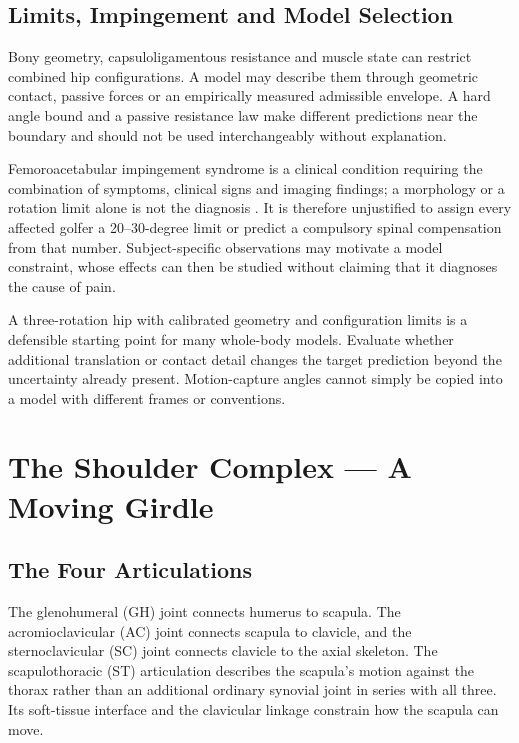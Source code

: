 \subsection{Limits, Impingement and Model Selection}\label{limits-impingement-and-model-selection}

Bony geometry, capsuloligamentous resistance and muscle state can restrict combined hip configurations. A model may describe them through geometric contact, passive forces or an empirically measured admissible envelope. A hard angle bound and a passive resistance law make different predictions near the boundary and should not be used interchangeably without explanation.

Femoroacetabular impingement syndrome is a clinical condition requiring the combination of symptoms, clinical signs and imaging findings; a morphology or a rotation limit alone is not the diagnosis \citep{Griffin2016Warwick}. It is therefore unjustified to assign every affected golfer a 20--30-degree limit or predict a compulsory spinal compensation from that number. Subject-specific observations may motivate a model constraint, whose effects can then be studied without claiming that it diagnoses the cause of pain.

A three-rotation hip with calibrated geometry and configuration limits is a defensible starting point for many whole-body models. Evaluate whether additional translation or contact detail changes the target prediction beyond the uncertainty already present. Motion-capture angles cannot simply be copied into a model with different frames or conventions.

\section{The Shoulder Complex --- A Moving Girdle}\label{sec-shoulder_complex}\label{sec:shoulder_complex}

\subsection{The Four Articulations}\label{the-four-articulations}

The glenohumeral (GH) joint connects humerus to scapula. The acromioclavicular (AC) joint connects scapula to clavicle, and the sternoclavicular (SC) joint connects clavicle to the axial skeleton. The scapulothoracic (ST) articulation describes the scapula's motion against the thorax rather than an additional ordinary synovial joint in series with all three. Its soft-tissue interface and the clavicular linkage constrain how the scapula can move.

